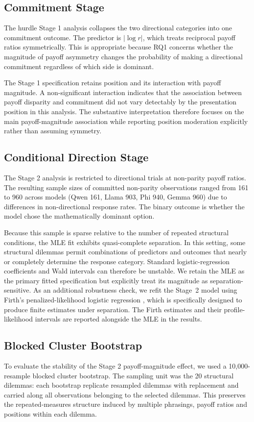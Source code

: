 \documentclass[10pt,journal,compsoc]{IEEEtran}
\begin{document}
\subsection{Commitment Stage}
The hurdle Stage 1 analysis collapses the two directional categories into one commitment outcome. The predictor is $|\log r|$, which treats reciprocal payoff ratios symmetrically. This is appropriate because RQ1 concerns whether the magnitude of payoff asymmetry changes the probability of making a directional commitment regardless of which side is dominant.

The Stage 1 specification retains position and its interaction with payoff magnitude. A non-significant interaction indicates that the association between payoff disparity and commitment did not vary detectably by the presentation position in this analysis. The substantive interpretation therefore focuses on the main payoff-magnitude association while reporting position moderation explicitly rather than assuming symmetry.

\subsection{Conditional Direction Stage}
The Stage 2 analysis is restricted to directional trials at non-parity payoff ratios. The resulting sample sizes of committed non-parity observations ranged from 161 to 960 across models (Qwen 161, Llama 903, Phi 940, Gemma 960) due to differences in non-directional response rates. The binary outcome is whether the model chose the mathematically dominant option.

Because this sample is sparse relative to the number of repeated structural conditions, the MLE fit exhibits quasi-complete separation. In this setting, some structural dilemmas permit combinations of predictors and outcomes that nearly or completely determine the response category. Standard logistic-regression coefficients and Wald intervals can therefore be unstable. We retain the MLE as the primary fitted specification but explicitly treat its magnitude as separation-sensitive. As an additional robustness check, we refit the Stage~2 model using Firth's penalized-likelihood logistic regression \cite{firth_1993}, which is specifically designed to produce finite estimates under separation. The Firth estimates and their profile-likelihood intervals are reported alongside the MLE in the results.

\subsection{Blocked Cluster Bootstrap}
To evaluate the stability of the Stage 2 payoff-magnitude effect, we used a 10,000-resample blocked cluster bootstrap. The sampling unit was the 20 structural dilemmas: each bootstrap replicate resampled dilemmas with replacement and carried along all observations belonging to the selected dilemmas. This preserves the repeated-measures structure induced by multiple phrasings, payoff ratios and positions within each dilemma.
\end{document}

